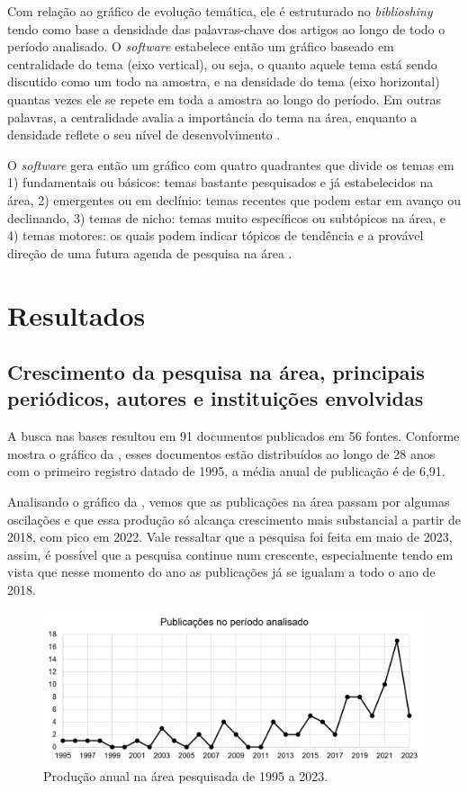 \documentclass[portuguese]{textolivre}
\begin{document}
Com relação ao gráfico de evolução temática, ele é estruturado no \textit{biblioshiny} tendo como base a densidade das palavras-chave dos artigos ao longo de todo o período analisado. O \textit{software} estabelece então um gráfico baseado em centralidade do tema (eixo vertical), ou seja, o quanto aquele tema está sendo discutido como um todo na amostra, e na densidade do tema (eixo horizontal) quantas vezes ele se repete em toda a amostra ao longo do período. Em outras palavras, a centralidade avalia a importância do tema na área, enquanto a densidade reflete o seu nível de desenvolvimento \cite{shi_mapping_2021}.

O \textit{software} gera então um gráfico com quatro quadrantes que divide os temas em 1) fundamentais ou básicos: temas bastante pesquisados e já estabelecidos na área, 2) emergentes ou em declínio: temas recentes que podem estar em avanço ou declinando, 3) temas de nicho: temas muito específicos ou subtópicos na área, e 4) temas motores: os quais podem indicar tópicos de tendência e a provável direção de uma futura agenda de pesquisa na área \cite{ortiz-rojo_empreendedorismo_2023}.


\section{Resultados}

\subsection{Crescimento da pesquisa na área, principais periódicos, autores e instituições envolvidas}

A busca nas bases resultou em 91 documentos publicados em 56 fontes. Conforme mostra o gráfico da , esses documentos estão distribuídos ao longo de 28 anos com o primeiro registro datado de 1995, a média anual de publicação é de 6,91.

Analisando o gráfico da , vemos que as publicações na área passam por algumas oscilações e que essa produção só alcança crescimento mais substancial a partir de 2018, com pico em 2022. Vale ressaltar que a pesquisa foi feita em maio de 2023, assim, é possível que a pesquisa continue num crescente, especialmente tendo em vista que nesse momento do ano as publicações já se igualam a todo o ano de 2018.

\begin{figure}[h!]
    \centering
    \includegraphics[width=0.8\linewidth]{Fig2.png}
    \caption{Produção anual na área pesquisada de 1995 a 2023.}
    \label{fig2}
\end{figure}
\end{document}
